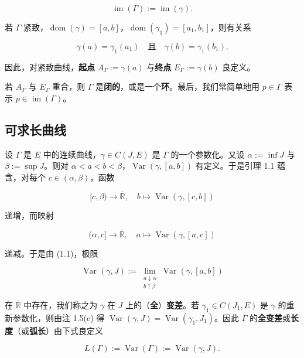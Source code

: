 \begin{remark}
\[
\operatorname{im}(\Gamma) := \operatorname{im}(\gamma) .
\]

若 $ \Gamma $ 紧致，$ \operatorname{dom}(\gamma) = [a,b] $，$ \operatorname{dom}(\gamma_1) = [a_1,b_1] $，则有关系

\[
\gamma(a) = \gamma_1(a_1) \quad \text{且}\quad \gamma(b) = \gamma_1(b_1) .
\]

因此，对紧致曲线，\textbf{起点} $ A_{\Gamma} := \gamma(a) $ 与\textbf{终点} $ E_{\Gamma} := \gamma(b) $ 良定义。

若 $ A_{\Gamma} $ 与 $ E_{\Gamma} $ 重合，则 $ \Gamma $ 是\textbf{闭的}，或是一个\textbf{环}。最后，我们常简单地用 $ p \in \Gamma $ 表示 $ p \in \operatorname{im}(\Gamma) $。

\end{remark}

\subsection*{可求长曲线}

设 $ \Gamma $ 是 $ E $ 中的连续曲线，$ \gamma \in C(J,E) $ 是 $ \Gamma $ 的一个参数化。又设 $ \alpha := \inf J $ 与 $ \beta := \sup J $。则对 $ \alpha < a < b < \beta $，$ \operatorname{Var}(\gamma,[a,b]) $ 有定义。于是引理 1.1 蕴含，对每个 $ c \in (\alpha,\beta) $，函数

\[
[c,\beta) \to \overline{\mathbb{R}} , \quad b \mapsto \operatorname{Var}(\gamma,[c,b])
\]

递增，而映射

\[
(\alpha,c] \to \overline{\mathbb{R}} , \quad a \mapsto \operatorname{Var}(\gamma,[a,c])
\]

递减。于是由 (1.1)，极限

\begin{equation}
\operatorname{Var}(\gamma,J) := \lim_{\substack{a \downarrow \alpha \\ b \uparrow \beta}}\operatorname{Var}(\gamma,[a,b])\tag{1.5}
\end{equation}

在 $ \overline{\mathbb{R}} $ 中存在，我们称之为 $ \gamma $ 在 $ J $ 上的（\textbf{全}）\textbf{变差}。若 $ \gamma_1 \in C(J_1,E) $ 是 $ \gamma $ 的重新参数化，则由注 1.5(c) 得 $ \operatorname{Var}(\gamma,J) = \operatorname{Var}(\gamma_1,J_1) $。因此 $ \Gamma $ 的\textbf{全变差}或\textbf{长度}（或\textbf{弧长}）由下式良定义

\[
L(\Gamma) := \operatorname{Var}(\Gamma) := \operatorname{Var}(\gamma,J) .
\]

